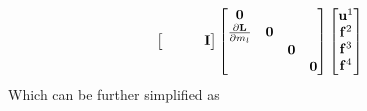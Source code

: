 \documentclass[revised,endfloat]{geophysics}
\begin{document}
\begin{equation}
\begin{split}
\begin{bmatrix}
 & & & {\bf I} \\
\end {bmatrix}
\begin{bmatrix}
{\bf 0} & & & \\
\frac{\partial {\bf L}}{\partial m_l} & {\bf 0} & & \\
 & &  {\bf 0}& \\
 & & & {\bf 0} \\
\end {bmatrix}
\begin{bmatrix}
{\bf u}^1 \\
{\bf f}^2 \\
{\bf f}^3 \\
{\bf f}^4 \\
\end{bmatrix}
\end{split}
\label{eq55}
\end{equation}
Which can be further simplified as 
\end{document}
